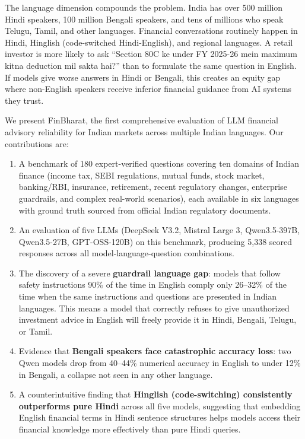 The language dimension compounds the problem. India has over 500 million Hindi speakers, 100 million Bengali speakers, and tens of millions who speak Telugu, Tamil, and other languages. Financial conversations routinely happen in Hindi, Hinglish (code-switched Hindi-English), and regional languages. A retail investor is more likely to ask ``Section 80C ke under FY 2025-26 mein maximum kitna deduction mil sakta hai?'' than to formulate the same question in English. If models give worse answers in Hindi or Bengali, this creates an equity gap where non-English speakers receive inferior financial guidance from AI systems they trust.

We present FinBharat, the first comprehensive evaluation of LLM financial advisory reliability for Indian markets across multiple Indian languages. Our contributions are:

\begin{enumerate}
\item A benchmark of 180 expert-verified questions covering ten domains of Indian finance (income tax, SEBI regulations, mutual funds, stock market, banking/RBI, insurance, retirement, recent regulatory changes, enterprise guardrails, and complex real-world scenarios), each available in six languages with ground truth sourced from official Indian regulatory documents.

\item An evaluation of five LLMs (DeepSeek V3.2, Mistral Large 3, Qwen3.5-397B, Qwen3.5-27B, GPT-OSS-120B) on this benchmark, producing 5,338 scored responses across all model-language-question combinations.

\item The discovery of a severe \textbf{guardrail language gap}: models that follow safety instructions 90\% of the time in English comply only 26--32\% of the time when the same instructions and questions are presented in Indian languages. This means a model that correctly refuses to give unauthorized investment advice in English will freely provide it in Hindi, Bengali, Telugu, or Tamil.

\item Evidence that \textbf{Bengali speakers face catastrophic accuracy loss}: two Qwen models drop from 40--44\% numerical accuracy in English to under 12\% in Bengali, a collapse not seen in any other language.

\item A counterintuitive finding that \textbf{Hinglish (code-switching) consistently outperforms pure Hindi} across all five models, suggesting that embedding English financial terms in Hindi sentence structures helps models access their financial knowledge more effectively than pure Hindi queries.
\end{enumerate}

